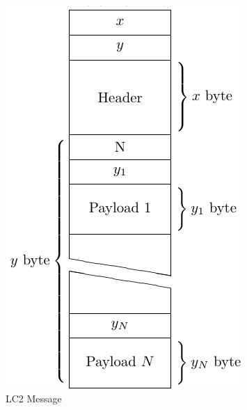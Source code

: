 \begin{figure}[h!]
  \centering
  \includegraphics{bin/assets/binary-message-format.pdf}
  \caption{LC2 Message}
  \label{fig:lc2binary}
\end{figure}

\clearpage
